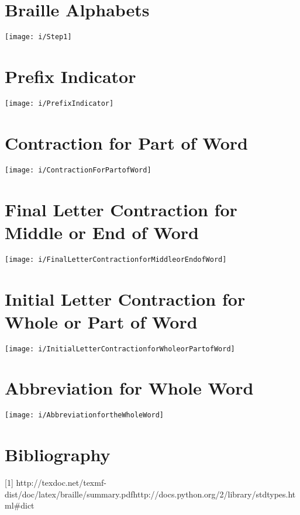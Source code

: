 \documentclass[26pt]{article}
\begin{document}








\appendix
\section{Braille Alphabets}
\texttt{[image: i/Step1]}
\section{Prefix Indicator}
\texttt{[image: i/PrefixIndicator]}
\section{Contraction for Part of Word}
\texttt{[image: i/ContractionForPartofWord]}
\section{Final Letter Contraction for Middle or End of Word}
\texttt{[image: i/FinalLetterContractionforMiddleorEndofWord]}
\section{Initial Letter Contraction for Whole or Part of Word}
\texttt{[image: i/InitialLetterContractionforWholeorPartofWord]}
\section{Abbreviation for Whole Word}
\texttt{[image: i/AbbreviationfortheWholeWord]}


\section{Bibliography}

[1] http://texdoc.net/texmf-dist/doc/latex/braille/summary.pdf\newline
[2] http://docs.python.org/2/library/stdtypes.html\#dict
\end{document}
